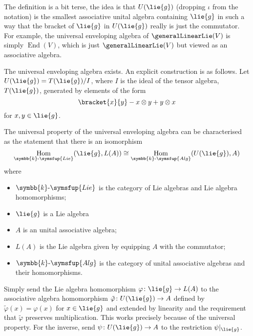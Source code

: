 \documentclass[fleqn]{NotesClass}
\makeatletter
\renewcommand{\field}{\symbb{k}}
\DeclareMathOperator{\End}{End}
\DeclareMathOperator{\Hom}{Hom}
\newcommand{\c@egory}[1]{\symsfup{#1}}
\newcommand{\Alg}[1][\field]{{#1}\text{-}\c@egory{Alg}}
\newcommand{\Lie}[1][\field]{{#1}\text{-}\c@egory{Lie}}
\newcommand{\isomorphic}{\cong}
\makeatother
\begin{document}
    The definition is a bit terse, the idea is that \(U(\lie{g})\) (dropping \(\iota\) from the notation) is the smallest associative unital algebra containing \(\lie{g}\) in such a way that the bracket of \(\lie{g}\) in \(U(\lie{g})\) really is just the commutator.
    For example, the universal enveloping algebra of \(\generalLinearLie(V)\) is simply \(\End(V)\), which is just \(\generalLinearLie(V)\) but viewed as an associative algebra.
    
    \begin{thm}{}{}
        The universal enveloping algebra exists.
        An explicit construction is as follows.
        Let \(U(\lie{g}) = T(\lie{g})/I\), where \(I\) is the ideal of the tensor algebra, \(T(\lie{g})\), generated by elements of the form
        \begin{equation}
            \bracket{x}{y} - x \otimes y + y \otimes x
        \end{equation}
        for \(x, y \in \lie{g}\).
    \end{thm}
    
    The universal property of the universal enveloping algebra can be characterised as the statement that there is an isomorphism
    \begin{equation}
        \Hom_{\Lie}(\lie{g}, L(A)) \isomorphic \Hom_{\Alg}(U(\lie{g}), A)
    \end{equation}
    where
    \begin{itemize}
        \item \(\Lie\) is the category of Lie algebras and Lie algebra homomorphisms;
        \item \(\lie{g}\) is a Lie algebra
        \item \(A\) is an unital associative algebra;
        \item \(L(A)\) is the Lie algebra given by equipping \(A\) with the commutator;
        \item \(\Alg\) is the category of unital associative algebras and their homomorphisms.
    \end{itemize}
    Simply send the Lie algebra homomorphism \(\varphi \colon \lie{g} \to L(A)\) to the associative algebra homomorphism \(\tilde{\varphi} \colon U(\lie{g}) \to A\) defined by \(\tilde{\varphi}(x) = \varphi(x)\) for \(x \in \lie{g}\) and extended by linearity and the requirement that \(\tilde{\varphi}\) preserves multiplication.
    This works precisely because of the universal property.
    For the inverse, send \(\psi \colon U(\lie{g}) \to A\) to the restriction \(\psi|_{\lie{g}}\).
    
\end{document}
